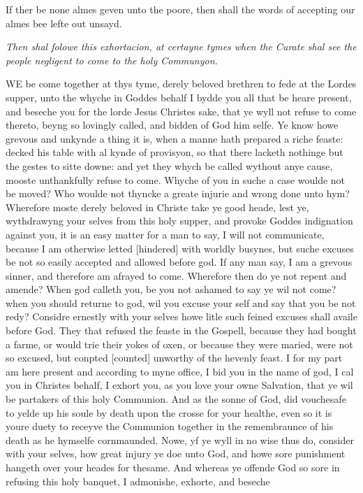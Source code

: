 If ther
be none almes geven unto the poore, then shall the words of accepting
our almes bee lefte out unsayd.

\emph{Then
shal folowe this exhortacion, at certayne tymes when the Curate shal
see the people negligent to come to the holy Communyon.}

WE
be come together at thys tyme, derely beloved brethren to fede at the
Lordes supper, unto the whyche in Goddes behalf I bydde you all that be
heare present, and beseche you for the lorde Jesus Christes sake, that
ye wyll not refuse to come thereto, beyng so lovingly called, and bidden
of God him selfe. Ye know howe grevous and unkynde a thing it is, when
a manne hath prepared a riche feaste: decked his table with al kynde of
provisyon, so that there lacketh nothinge but the gestes to sitte downe:
and yet they whych be called wythout anye cause, mooste unthankfully refuse
to come. Whyche of you in suche a case woulde not be moved? Who woulde
not thyncke a greate injurie and wrong done unto hym? Wherefore moste
derely beloved in Christe take ye good heade, lest ye, wythdrawyng your
selves from this holy supper, and provoke Goddes indignation against you,
it is an easy matter for a man to say, I will not communicate, because
I am otherwise letted [hindered]
with worldly busynes, but suche excuses be not so easily accepted and
allowed before god. If any man say, I am a grevous sinner, and therefore
am afrayed to come. Wherefore then do ye not repent and amende? When god
calleth you, be you not ashamed to say ye wil not come? when you should
returne to god, wil you excuse your self and say that you be not redy?
Considre ernestly with your selves howe litle such feined excuses shall
availe before God. They that refused the feaste in the Gospell, because
they had bought a farme, or would trie their yokes of oxen, or because
they were maried, were not so excused, but conpted [counted]
unworthy of the hevenly feast. I for my part am here present and according
to myne office, I bid you in the name of god, I cal you in Christes behalf,
I exhort you, as you love your owne Salvation, that ye wil be partakers
of this holy Communion. And as the sonne of God, did vouchesafe to yelde
up his soule by death upon the crosse for your healthe, even so it is
youre duety to receyve the Communion together in the remembraunce of his
death as he hymselfe cornmaunded. Nowe, yf ye wyll in no wise thus do,
consider with your selves, how great injury ye doe unto God, and howe
sore punishment hangeth over your heades for thesame. And whereas ye offende
God so sore in refusing this holy banquet, I admonishe, exhorte, and beseche
